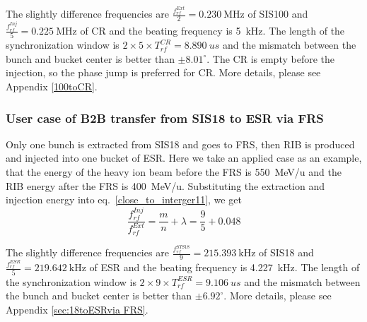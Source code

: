 The slightly difference frequencies are $\frac{f_{rf}^{Ext}}{2}=\SI{0.230}{\MHz}$ of SIS100 and $\frac{f_{rf}^{Inj}}{5}=\SI{0.225}{\MHz}$ of CR and the beating frequency is \SI{5}{\kHz}. The length of the synchronization window is $2\times 5 \times T_{rf}^{CR}= \SI{8.890}{us}$ and the mismatch between the bunch and bucket center is better than $\pm8.01^\circ$. The CR is empty before the injection, so the phase jump is preferred for CR. More details, please see Appendix \ref{100toCR}.

\subsubsection{User case of B2B transfer from SIS18 to ESR via FRS} 
Only one bunch is extracted from SIS18 and goes to FRS, then RIB is produced and injected into one bucket of ESR. Here we take an applied case as an example, that the energy of the heavy ion beam before the FRS is \SI{550}{MeV/\atomicmassunit} and the RIB energy after the FRS is \SI{400}{MeV/\atomicmassunit}. Substituting the extraction and injection energy into eq.~\ref{close_to_interger11}, we get
\begin{equation} 
\frac{f_{rf}^{Inj}}{f_{rf}^{Ext}}=\frac{m}{n}+ \lambda=\frac{9}{5}+0.048
\end{equation}

The slightly difference frequencies are $\frac{f_{rf}^{SIS18}}{9}=\SI{215.393}{\kHz}$ of SIS18 and $\frac{f_{rf}^{ESR}}{5}=\SI{219.642}{\kHz}$ of ESR and the beating frequency is \SI{4.227}{\kHz}. The length of the synchronization window is $2\times 9 \times T_{rf}^{ESR}= \SI{9.106}{us}$ and the mismatch between the bunch and bucket center is better than $\pm6.92^\circ$. More details, please see Appendix \ref{sec:18toESRvia FRS}.
